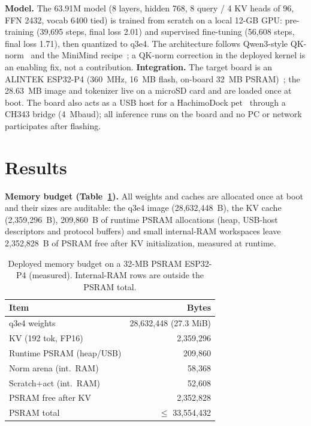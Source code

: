 \documentclass[journal,letterpaper]{IEEEtran}
\begin{document}
\textbf{Model.} The 63.91M model (8 layers, hidden 768, 8 query / 4 KV heads of 96, FFN 2432,
vocab 6400 tied) is trained from scratch on a local 12-GB GPU: pre-training (39,695 steps, final
loss 2.01) and supervised fine-tuning (56,608 steps, final loss 1.71), then quantized to q3e4.
The architecture follows Qwen3-style QK-norm~\cite{qwen3} and the MiniMind recipe~\cite{minimind};
a QK-norm correction in the deployed kernel is an enabling fix, not a contribution.
\textbf{Integration.} The target board is an ALINTEK ESP32-P4 (360~MHz, 16~MB flash, on-board
32~MB PSRAM)~\cite{psram}; the 28.63~MB image and tokenizer live on a microSD card and are loaded
once at boot. The board also acts as a USB host for a HachimoDock pet~\cite{hachimodock} through
a CH343 bridge (4~Mbaud); all inference runs on the board and no PC or network participates after
flashing.

\section{Results}
\textbf{Memory budget (Table~\ref{tab:budget}).} All weights and caches are allocated once at
boot and their sizes are auditable: the q3e4 image (28,632,448~B), the KV cache
(2,359,296~B), 209,860~B of runtime PSRAM allocations (heap, USB-host descriptors and protocol
buffers) and small internal-RAM workspaces leave 2,352,828~B of PSRAM free after KV
initialization, measured at runtime.

\begin{table}[t]
\centering
\caption{Deployed memory budget on a 32-MB PSRAM ESP32-P4 (measured). Internal-RAM rows are outside the PSRAM total.}
\label{tab:budget}
\footnotesize
\setlength{\tabcolsep}{2.5pt}
\begin{tabular}{@{}lr@{}}
\toprule
Item & Bytes \\
\midrule
q3e4 weights & 28,632,448 (27.3 MiB) \\
KV (192 tok, FP16) & 2,359,296 \\
Runtime PSRAM (heap/USB) & 209,860 \\
Norm arena (int.\ RAM) & 58,368 \\
Scratch+act (int.\ RAM) & 52,608 \\
PSRAM free after KV & 2,352,828 \\
\midrule
PSRAM total & $\leq$ 33,554,432 \\
\bottomrule
\end{tabular}
\end{table}
\end{document}
